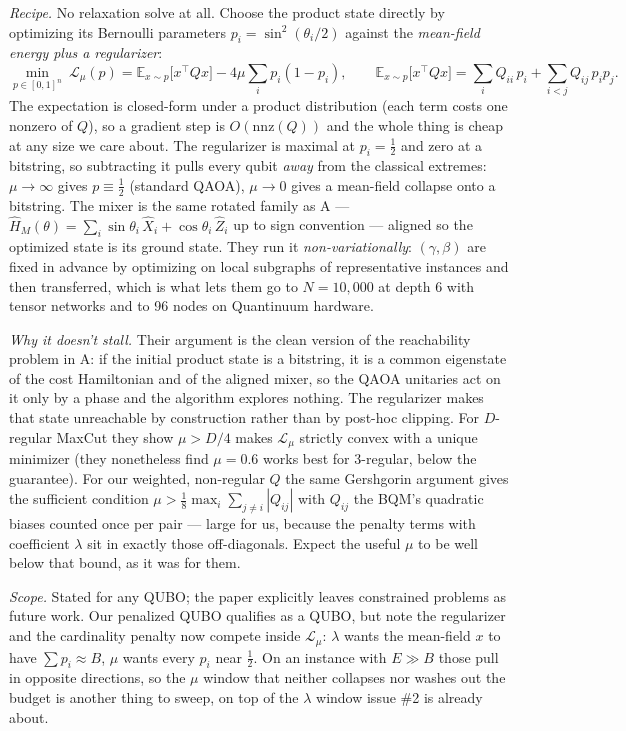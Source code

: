 \documentclass[11pt]{article}
\begin{document}
\emph{Recipe.} No relaxation solve at all. Choose the product state directly by optimizing its Bernoulli parameters $p_i = \sin^2(\theta_i/2)$ against the \emph{mean-field energy plus a regularizer}:
\[
\min_{p \in [0,1]^n}\ \mathcal{L}_\mu(p) = \mathbb{E}_{x \sim p}\big[x^\top Q x\big] - 4\mu \sum_i p_i(1-p_i),
\qquad
\mathbb{E}_{x \sim p}\big[x^\top Q x\big] = \sum_i Q_{ii}\,p_i + \sum_{i<j} Q_{ij}\,p_i p_j .
\]
The expectation is closed-form under a product distribution (each term costs one nonzero of $Q$), so a gradient step is $O(\mathrm{nnz}(Q))$ and the whole thing is cheap at any size we care about. The regularizer is maximal at $p_i = \tfrac12$ and zero at a bitstring, so subtracting it pulls every qubit \emph{away} from the classical extremes: $\mu \to \infty$ gives $p \equiv \tfrac12$ (standard QAOA), $\mu \to 0$ gives a mean-field collapse onto a bitstring. The mixer is the same rotated family as A --- $\hat H_M(\theta) = \sum_i \sin\theta_i\,\hat X_i + \cos\theta_i\,\hat Z_i$ up to sign convention --- aligned so the optimized state is its ground state. They run it \emph{non-variationally}: $(\gamma, \beta)$ are fixed in advance by optimizing on local subgraphs of representative instances and then transferred, which is what lets them go to $N = 10{,}000$ at depth 6 with tensor networks and to 96 nodes on Quantinuum hardware.

\emph{Why it doesn't stall.} Their argument is the clean version of the reachability problem in A: if the initial product state is a bitstring, it is a common eigenstate of the cost Hamiltonian and of the aligned mixer, so the QAOA unitaries act on it only by a phase and the algorithm explores nothing. The regularizer makes that state unreachable by construction rather than by post-hoc clipping. For $D$-regular MaxCut they show $\mu > D/4$ makes $\mathcal L_\mu$ strictly convex with a unique minimizer (they nonetheless find $\mu = 0.6$ works best for 3-regular, below the guarantee). For our weighted, non-regular $Q$ the same Gershgorin argument gives the sufficient condition $\mu > \tfrac18 \max_i \sum_{j \ne i} |Q_{ij}|$ with $Q_{ij}$ the BQM's quadratic biases counted once per pair --- large for us, because the penalty terms with coefficient $\lambda$ sit in exactly those off-diagonals. Expect the useful $\mu$ to be well below that bound, as it was for them.

\emph{Scope.} Stated for any QUBO; the paper explicitly leaves constrained problems as future work. Our penalized QUBO qualifies as a QUBO, but note the regularizer and the cardinality penalty now compete inside $\mathcal L_\mu$: $\lambda$ wants the mean-field $x$ to have $\sum p_i \approx B$, $\mu$ wants every $p_i$ near $\tfrac12$. On an instance with $E \gg B$ those pull in opposite directions, so the $\mu$ window that neither collapses nor washes out the budget is another thing to sweep, on top of the $\lambda$ window issue \#2 is already about.
\end{document}
